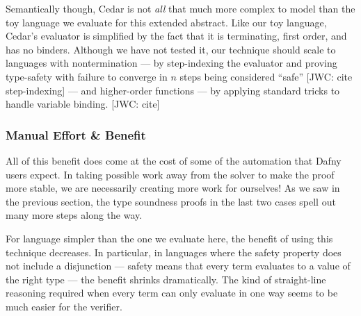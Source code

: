 \documentclass[sigplan,review,screen,anonymous]{acmart}
\newcommand{\comm}[3]{\textcolor{#1}{[#2: #3]}}
\newcommand{\jwc}[1]{\comm{dkgreen}{JWC}{#1}}
\begin{document}
Semantically though, Cedar is not \emph{all} that much more complex to model than the
toy language we evaluate for this extended abstract. Like our toy language,
Cedar's evaluator is simplified by the fact that it is terminating, first order, and has no binders.  Although we have not tested it, our
technique should scale to languages with nontermination --- by step-indexing the
evaluator and proving type-safety with failure to converge in $n$ steps being
considered ``safe'' \jwc{cite step-indexing} --- and higher-order functions ---
by applying standard tricks to handle variable binding. \jwc{cite}


\subsubsection*{Manual Effort \& Benefit}
All of this benefit does come at the cost of some of the automation that Dafny
users expect. In taking possible work away from the solver to make the proof
more stable, we are necessarily creating more work for ourselves!  As we saw in
the previous section, the type soundness proofs in the last two cases spell out
many more steps along the way.

For language simpler than the one we evaluate here, the benefit of using this technique decreases. In particular, in languages
where the safety property does not include a disjunction --- safety means that every term evaluates to a value of the right type ---
the benefit shrinks dramatically. The kind of straight-line reasoning required when every term can only evaluate in one way seems to be
much easier for the verifier.





\end{document}
